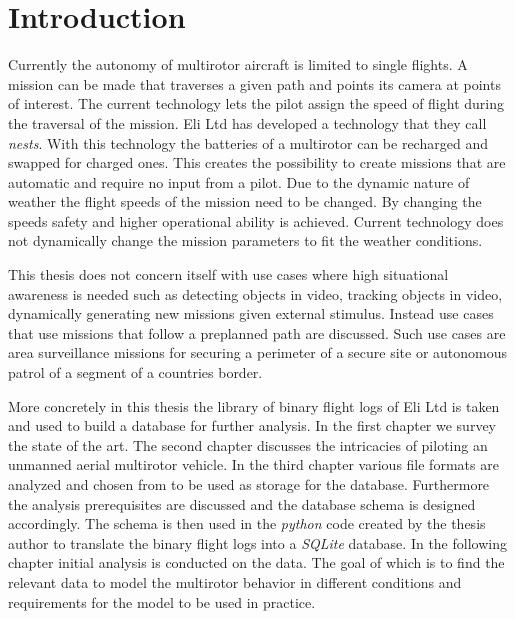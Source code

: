 \documentclass[12pt,oneside]{reedthesis}
\theoremstyle{definition}
\theoremstyle{definition}
\theoremstyle{definition}
\theoremstyle{remark}
\begin{document}
  \hypersetup{linkcolor=black}
  \setcounter{tocdepth}{2}
  \tableofcontents

  \listoffigures

  \listoftables

\mainmatter %
\pagestyle{plain} %

\chapter*{Introduction}\label{introduction}

Currently the autonomy of multirotor aircraft is limited to single
flights. A mission can be made that traverses a given path and points
its camera at points of interest. The current technology lets the pilot
assign the speed of flight during the traversal of the mission. Eli Ltd
has developed a technology that they call \emph{nests}. With this
technology the batteries of a multirotor can be recharged and swapped
for charged ones. This creates the possibility to create missions that
are automatic and require no input from a pilot. Due to the dynamic
nature of weather the flight speeds of the mission need to be changed.
By changing the speeds safety and higher operational ability is
achieved. Current technology does not dynamically change the mission
parameters to fit the weather conditions.

This thesis does not concern itself with use cases where high
situational awareness is needed such as detecting objects in video,
tracking objects in video, dynamically generating new missions given
external stimulus. Instead use cases that use missions that follow a
preplanned path are discussed. Such use cases are area surveillance
missions for securing a perimeter of a secure site or autonomous patrol
of a segment of a countries border.

More concretely in this thesis the library of binary flight logs of Eli
Ltd is taken and used to build a database for further analysis. In the
first chapter we survey the state of the art. The second chapter
discusses the intricacies of piloting an unmanned aerial multirotor
vehicle. In the third chapter various file formats are analyzed and
chosen from to be used as storage for the database. Furthermore the
analysis prerequisites are discussed and the database schema is designed
accordingly. The schema is then used in the \emph{python} code created
by the thesis author to translate the binary flight logs into a
\emph{SQLite} database. In the following chapter initial analysis is
conducted on the data. The goal of which is to find the relevant data to
model the multirotor behavior in different conditions and requirements
for the model to be used in practice.
\end{document}
